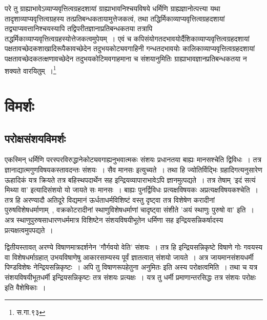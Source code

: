 		{\fontsize{11.7}{0}\selectfont\s परे तु ग्राह्याभावेऽव्याप्यवृत्तित्वग्रहदशायां ग्राह्याभावनिश्चयविषये धर्मिणि ग्राह्यज्ञानोत्पत्त्या यथा तादृशाव्याप्यवृत्तित्वग्रहस्य तत्प्रतिबन्धकतायामुत्तेजकत्वं, तथा तद्धिर्मिकाव्याप्यवृत्तित्वग्रहदशायां तद्व्याप्यवत्तानिश्चयस्यापि तद्विपरीतज्ञानाप्रतिबन्धकतया तत्रापि तद्धर्मिकाव्याप्यवृत्तित्वग्रहस्योत्तेजकत्वमुपेयम्~। एवं च कपिसंयोगतदभावयोर्दैशिकाव्याप्यवृत्तित्वग्रहदशायां पक्षतावच्छेदकशाखादिरूपैकावच्छेदेन तदुभयकोट्यवगाहिनी गन्धतदभावयोः कालिकाव्याप्यवृत्तित्वग्रहदशायां पक्षतावच्छेदकतत्क्षणावच्छेदेन तदुभयकोटिमवगाहमाना च संशयानुमितिः ग्राह्याभावज्ञानप्रतिबन्धकतया न शक्यते वारयितुम्~।\footnote{स.गा.९३}}


	\section{विमर्शः}

		\subsection{परोक्षसंशयविमर्शः}

		एकस्मिन् धर्मिणि परस्परविरुद्धानेकोट्यवगाह्यनुभवात्मकः संशयः प्रधानतया बाह्यः मानसश्चेति द्विविधः~। तत्र ज्ञानाद्यात्मगुणविषयकस्तावदन्तः संशयः~। सैव मानसः इत्युच्यते~। तथा हि ज्योतिर्विद्भिः ग्रहादिगत्यनुसारेण ऊहादिकं यत्र क्रियते तत्र बहिस्थपदार्थेन सह इन्द्रियव्यापाराभावेऽपि ज्ञानमुत्पद्यते~। तत्र तेषाम् 'इदं सत्यं मिथ्या वा' इत्यादिसंशयो यो जायते सः मानसः~। बाह्यः पुनर्द्विविधः प्रत्यक्षविषयकः अप्रत्यक्षविषयकश्चेति~। तत्र हि अरण्यादौ अतिदूरे विद्यमानं ऊर्धताधर्मविशिष्टं वस्तु दृष्ट्वा तत्र विशेषेण करादीनां पुरुषविशेषधर्माणाम्~, वक्रकोटरादीनां स्थाणुविशेषधर्माणां चादृष्ट्वा संशीते 'अयं स्थाणुः पुरुषो वा' इति~। अत्र स्थाणुपुरुषसाधारणधर्ममात्र विशिष्टेन संशयविषयीभूतेन धर्मिणा सह इन्द्रियसन्निकर्षादस्य प्रत्यक्षत्वमुपपद्यते~।

		द्वितीयस्तावत् अरण्ये विषाणमात्रदर्शनेन 'गौर्गवयो वेति' संशयः~। तत्र हि इन्द्रियसन्निकृष्टे विषाणे गोः गवयस्य वा विशेषधर्माग्रहात् उभयविषाणेषु आकारसाम्यस्य पूर्वं ज्ञातत्वात् संशयो जायते~। अत्र जायमानसंशयधर्मी पिण्डविशेषः नेन्द्रियसन्निकृष्टः~। अपि तु विषाणरूपहेतुना अनुमितः इति अस्य परोक्षत्वमिति~। तथा च यत्र संशयविषयीभूतधर्मी इन्द्रियसन्निकृष्टः तत्र संशयः प्रत्यक्षः~। यत्र तु धर्मी प्रमाणान्तरसिद्धः तत्र संशयः परोक्षः इति वैशेषिकाः~।

